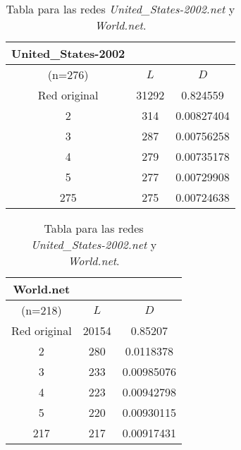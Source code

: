 \begin{table}[H]
\begin{minipage}{0.5\textwidth}
  \begin{tabular}{ccc}
    United\_States-2002 & & \\
    \hline
    (n=276)              &   $L$ &   $D$ \\
    \hline
    Red original &               31292 & 0.824559   \\
    2            &                 314 & 0.00827404 \\
    3            &                 287 & 0.00756258 \\
    4            &                 279 & 0.00735178 \\
    5            &                 277 & 0.00729908 \\
    275          &                 275 & 0.00724638 \\
    \hline
  \end{tabular}  
\end{minipage}
\begin{minipage}{0.35\textwidth}
  \begin{tabular}{ccc}
    World.net & & \\
    \hline
    (n=218)              &   $L$ &   $D$ \\
    \hline
    Red original &               20154 & 0.85207    \\
    2            &                 280 & 0.0118378  \\
    3            &                 233 & 0.00985076 \\
    4            &                 223 & 0.00942798 \\
    5            &                 220 & 0.00930115 \\
    217          &                 217 & 0.00917431 \\
    \hline
  \end{tabular}
\end{minipage}
\label{usw}
\caption{Tabla para las redes \textit{United\_States-2002.net} y \textit{World.net}.}
\end{table}
